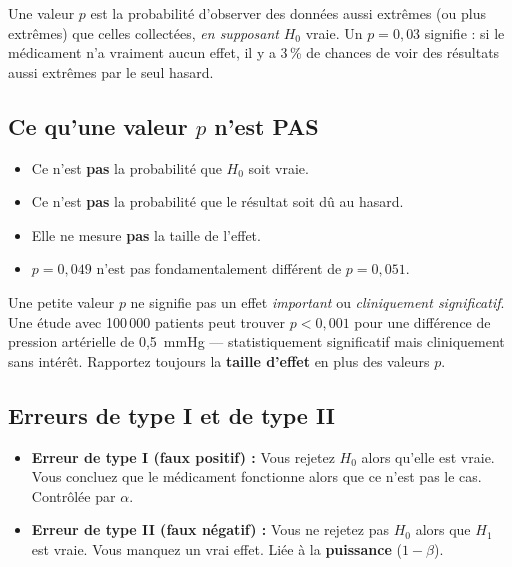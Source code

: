 Une valeur $p$ est la probabilit\'e d'observer des donn\'ees aussi extr\^emes (ou plus extr\^emes) que celles collect\'ees, \emph{en supposant} $H_0$ vraie. Un $p = 0{,}03$ signifie : si le m\'edicament n'a vraiment aucun effet, il y a 3\,\% de chances de voir des r\'esultats aussi extr\^emes par le seul hasard.

\subsection{Ce qu'une valeur $p$ n'est PAS}

\begin{itemize}
  \item Ce n'est \textbf{pas} la probabilit\'e que $H_0$ soit vraie.
  \item Ce n'est \textbf{pas} la probabilit\'e que le r\'esultat soit d\^u au hasard.
  \item Elle ne mesure \textbf{pas} la taille de l'effet.
  \item $p = 0{,}049$ n'est pas fondamentalement diff\'erent de $p = 0{,}051$.
\end{itemize}

\begin{warningbox}
Une petite valeur $p$ ne signifie pas un effet \emph{important} ou \emph{cliniquement significatif}. Une \'etude avec 100\,000 patients peut trouver $p < 0{,}001$ pour une diff\'erence de pression art\'erielle de 0,5~mmHg --- statistiquement significatif mais cliniquement sans int\'er\^et. Rapportez toujours la \textbf{taille d'effet} en plus des valeurs $p$.
\end{warningbox}

\subsection{Erreurs de type I et de type II}

\begin{itemize}
  \item \textbf{Erreur de type I (faux positif) :} Vous rejetez $H_0$ alors qu'elle est vraie. Vous concluez que le m\'edicament fonctionne alors que ce n'est pas le cas. Contr\^ol\'ee par $\alpha$.
  \item \textbf{Erreur de type II (faux n\'egatif) :} Vous ne rejetez pas $H_0$ alors que $H_1$ est vraie. Vous manquez un vrai effet. Li\'ee \`a la \textbf{puissance} ($1 - \beta$).
\end{itemize}

